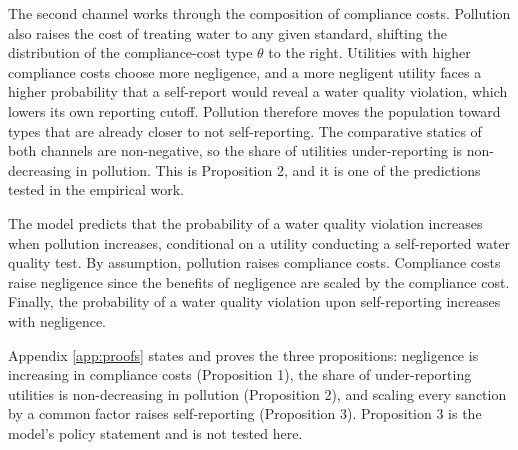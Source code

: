 \documentclass[12pt]{article}
\begin{document}
	The second channel works through the composition of compliance costs. Pollution also raises the cost of treating water to any given standard, shifting the distribution of the compliance-cost type $\theta$ to the right. Utilities with higher compliance costs choose more negligence, and a more negligent utility faces a higher probability that a self-report would reveal a water quality violation, which lowers its own reporting cutoff. Pollution therefore moves the population toward types that are already closer to not self-reporting. The comparative statics of both channels are non-negative, so the share of utilities under-reporting is non-decreasing in pollution. This is Proposition 2, and it is one of the predictions tested in the empirical work.

    The model predicts that the probability of a water quality violation increases when pollution increases, conditional on a utility conducting a self-reported water quality test. By assumption, pollution raises compliance costs. Compliance costs raise negligence since the benefits of negligence are scaled by the compliance cost. Finally, the probability of a water quality violation upon self-reporting increases with negligence. 
    


	Appendix \ref{app:proofs} states and proves the three propositions: negligence is increasing in compliance costs (Proposition 1), the share of under-reporting utilities is non-decreasing in pollution (Proposition 2), and scaling every sanction by a common factor raises self-reporting (Proposition 3). Proposition 3 is the model's policy statement and is not tested here.
    
\end{document}
